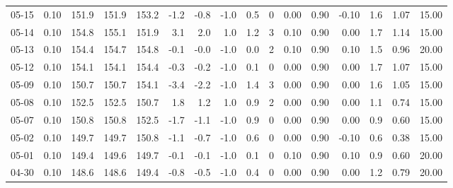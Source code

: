 \begin{threeparttable}
{\begin{tabular}{lrrrrrrrrrrrrrrr}
  05-15 &     0.10 & 151.9 & 151.9 & 153.2 &       -1.2 &           -0.8 &                     -1.0 &                 0.5 &              0 &       0.00 &      0.90 &          -0.10 &              1.6 &            1.07 &                  15.00 \\
  05-14 &     0.10 & 154.8 & 155.1 & 151.9 &        3.1 &            2.0 &                      1.0 &                 1.2 &              3 &       0.10 &      0.90 &           0.00 &              1.7 &            1.14 &                  15.00 \\
  05-13 &     0.10 & 154.4 & 154.7 & 154.8 &       -0.1 &           -0.0 &                     -1.0 &                 0.0 &              2 &       0.10 &      0.90 &           0.10 &              1.5 &            0.96 &                  20.00 \\
  05-12 &     0.10 & 154.1 & 154.1 & 154.4 &       -0.3 &           -0.2 &                     -1.0 &                 0.1 &              0 &       0.00 &      0.90 &           0.00 &              1.7 &            1.07 &                  15.00 \\
  05-09 &     0.10 & 150.7 & 150.7 & 154.1 &       -3.4 &           -2.2 &                     -1.0 &                 1.4 &              3 &       0.00 &      0.90 &           0.00 &              1.6 &            1.05 &                  15.00 \\
  05-08 &     0.10 & 152.5 & 152.5 & 150.7 &        1.8 &            1.2 &                      1.0 &                 0.9 &              2 &       0.00 &      0.90 &           0.00 &              1.1 &            0.74 &                  15.00 \\
  05-07 &     0.10 & 150.8 & 150.8 & 152.5 &       -1.7 &           -1.1 &                     -1.0 &                 0.9 &              0 &       0.00 &      0.90 &           0.00 &              0.9 &            0.60 &                  15.00 \\
  05-02 &     0.10 & 149.7 & 149.7 & 150.8 &       -1.1 &           -0.7 &                     -1.0 &                 0.6 &              0 &       0.00 &      0.90 &          -0.10 &              0.6 &            0.38 &                  15.00 \\
  05-01 &     0.10 & 149.4 & 149.6 & 149.7 &       -0.1 &           -0.1 &                     -1.0 &                 0.1 &              0 &       0.10 &      0.90 &           0.10 &              0.9 &            0.60 &                  20.00 \\
  04-30 &     0.10 & 148.6 & 148.6 & 149.4 &       -0.8 &           -0.5 &                     -1.0 &                 0.4 &              0 &       0.00 &      0.90 &           0.00 &              1.2 &            0.79 &                  20.00 \\

\end{tabular}}
\end{threeparttable}
